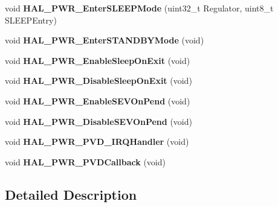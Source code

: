\begin{DoxyCompactItemize}
\item 
\mbox{\label{group___p_w_r___exported___functions___group2_ga5c84f4e046525c22d233c8a3443fab5f}} 
void {\bfseries H\+A\+L\+\_\+\+P\+W\+R\+\_\+\+Enter\+S\+L\+E\+E\+P\+Mode} (uint32\+\_\+t Regulator, uint8\+\_\+t S\+L\+E\+E\+P\+Entry)
\item 
\mbox{\label{group___p_w_r___exported___functions___group2_ga40736f74c169077fcd08f34470559aa2}} 
void {\bfseries H\+A\+L\+\_\+\+P\+W\+R\+\_\+\+Enter\+S\+T\+A\+N\+D\+B\+Y\+Mode} (void)
\item 
\mbox{\label{group___p_w_r___exported___functions___group2_ga85d0154c96068b286072a64fca4c7e6a}} 
void {\bfseries H\+A\+L\+\_\+\+P\+W\+R\+\_\+\+Enable\+Sleep\+On\+Exit} (void)
\item 
\mbox{\label{group___p_w_r___exported___functions___group2_ga1da299e8186a3e08a694865bd41c3bb0}} 
void {\bfseries H\+A\+L\+\_\+\+P\+W\+R\+\_\+\+Disable\+Sleep\+On\+Exit} (void)
\item 
\mbox{\label{group___p_w_r___exported___functions___group2_ga6f33b1c8c8cc85129c68ac302a281033}} 
void {\bfseries H\+A\+L\+\_\+\+P\+W\+R\+\_\+\+Enable\+S\+E\+V\+On\+Pend} (void)
\item 
\mbox{\label{group___p_w_r___exported___functions___group2_ga7811014def9b864dd490a63ada4bab68}} 
void {\bfseries H\+A\+L\+\_\+\+P\+W\+R\+\_\+\+Disable\+S\+E\+V\+On\+Pend} (void)
\item 
\mbox{\label{group___p_w_r___exported___functions___group2_gae3403237bde597d72b32f0434932a047}} 
void {\bfseries H\+A\+L\+\_\+\+P\+W\+R\+\_\+\+P\+V\+D\+\_\+\+I\+R\+Q\+Handler} (void)
\item 
\mbox{\label{group___p_w_r___exported___functions___group2_gaa4843b3eb7989f5b95e1218af4086940}} 
void {\bfseries H\+A\+L\+\_\+\+P\+W\+R\+\_\+\+P\+V\+D\+Callback} (void)
\end{DoxyCompactItemize}


\subsection{Detailed Description}
